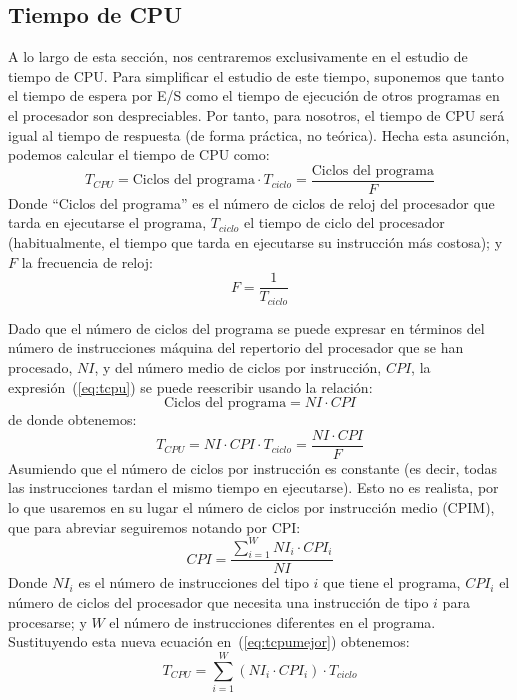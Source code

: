 \subsection{Tiempo de CPU}
A lo largo de esta sección, nos centraremos exclusivamente en el estudio de tiempo de CPU. Para simplificar el estudio de este tiempo, suponemos que tanto el tiempo de espera por E/S como el tiempo de ejecución de otros programas en el procesador son despreciables. Por tanto, para nosotros, el tiempo de CPU será igual al tiempo de respuesta (de forma práctica, no teórica). Hecha esta asunción, podemos calcular el tiempo de CPU como:
\begin{equation}
    T_{CPU} = \text{Ciclos del programa} \cdot T_{ciclo} = \dfrac{\text{Ciclos del programa}}{F}
    \label{eq:tcpu}
\end{equation}
Donde ``Ciclos del programa'' es el número de ciclos de reloj del procesador que tarda en ejecutarse el programa, $T_{ciclo}$ el tiempo de ciclo del procesador (habitualmente, el tiempo que tarda en ejecutarse su instrucción más costosa); y $F$ la frecuencia de reloj:
\begin{equation}
    F = \dfrac{1}{T_{ciclo}}
\end{equation}

Dado que el número de ciclos del programa se puede expresar en términos del número de instrucciones máquina del repertorio del procesador que se han procesado, $NI$, y del número medio de ciclos por instrucción, $CPI$, la expresión~(\ref{eq:tcpu}) se puede reescribir usando la relación:
\begin{equation}
    \text{Ciclos del programa} = NI\cdot CPI
\end{equation}
de donde obtenemos:
\begin{equation} \label{eq:tcpumejor}
    T_{CPU} = NI \cdot CPI \cdot T_{ciclo} = \dfrac{NI \cdot CPI}{F}
\end{equation}
Asumiendo que el número de ciclos por instrucción es constante (es decir, todas las instrucciones tardan el mismo tiempo en ejecutarse). Esto no es realista, por lo que usaremos en su lugar el número de ciclos por instrucción medio (CPIM), que para abreviar seguiremos notando por CPI:
\begin{equation}
    CPI = \dfrac{\sum_{i=1}^W NI_i \cdot CPI_i}{NI}
\end{equation}
Donde $NI_i$ es el número de instrucciones del tipo $i$ que tiene el programa, $CPI_i$ el número de ciclos del procesador que necesita una instrucción de tipo $i$ para procesarse; y $W$ el número de instrucciones diferentes en el programa. Sustituyendo esta nueva ecuación en~(\ref{eq:tcpumejor}) obtenemos:
\begin{equation}
    T_{CPU} = \sum_{i=1}^W \left(NI_i \cdot CPI_i \right) \cdot T_{ciclo}
\end{equation}

